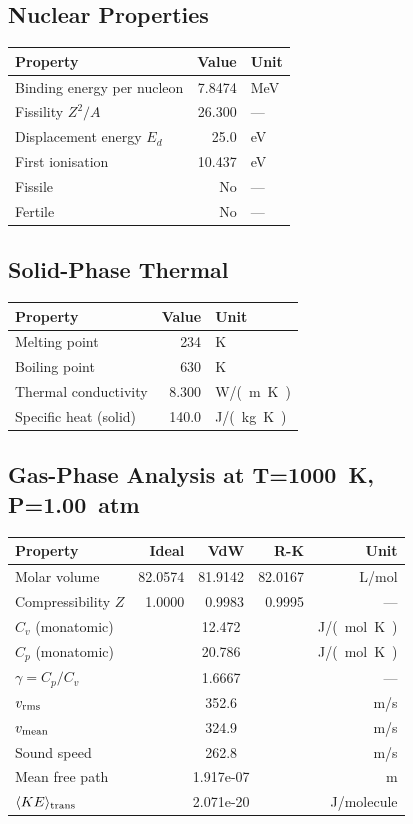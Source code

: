 \documentclass[11pt,a4paper]{article}
\begin{document}
\subsection{Nuclear Properties}
\begin{tabular}{lrl}
  \toprule
  Property & Value & Unit \\
  \midrule
  Binding energy per nucleon & 7.8474 & \si{MeV} \\
  Fissility $Z^2/A$ & 26.300 & --- \\
  Displacement energy $E_d$ & 25.0 & \si{eV} \\
  First ionisation & 10.437 & \si{eV} \\
  Fissile & No & --- \\
  Fertile & No & --- \\
  \bottomrule
\end{tabular}

\subsection{Solid-Phase Thermal}
\begin{tabular}{lrl}
  \toprule
  Property & Value & Unit \\
  \midrule
  Melting point & 234 & \si{K} \\
  Boiling point & 630 & \si{K} \\
  Thermal conductivity & 8.300 & \si{W/(m.K)} \\
  Specific heat (solid) & 140.0 & \si{J/(kg.K)} \\
  \bottomrule
\end{tabular}

\subsection{Gas-Phase Analysis at T=\SI{1000}{K}, P=\SI{1.00}{atm}}
\begin{tabular}{lrrrr}
  \toprule
  Property & Ideal & VdW & R-K & Unit \\
  \midrule
  Molar volume & 82.0574 & 81.9142 & 82.0167 & \si{L/mol} \\
  Compressibility $Z$ & 1.0000 & 0.9983 & 0.9995 & --- \\
  \midrule
  $C_v$ (monatomic) & \multicolumn{3}{c}{12.472} & \si{J/(mol.K)} \\
  $C_p$ (monatomic) & \multicolumn{3}{c}{20.786} & \si{J/(mol.K)} \\
  $\gamma = C_p/C_v$ & \multicolumn{3}{c}{1.6667} & --- \\
  $v_{\rm rms}$ & \multicolumn{3}{c}{352.6} & \si{m/s} \\
  $v_{\rm mean}$ & \multicolumn{3}{c}{324.9} & \si{m/s} \\
  Sound speed & \multicolumn{3}{c}{262.8} & \si{m/s} \\
  Mean free path & \multicolumn{3}{c}{1.917e-07} & \si{m} \\
  $\langle KE \rangle_{\rm trans}$ & \multicolumn{3}{c}{2.071e-20} & \si{J/molecule} \\
  \bottomrule
\end{tabular}
\end{document}
